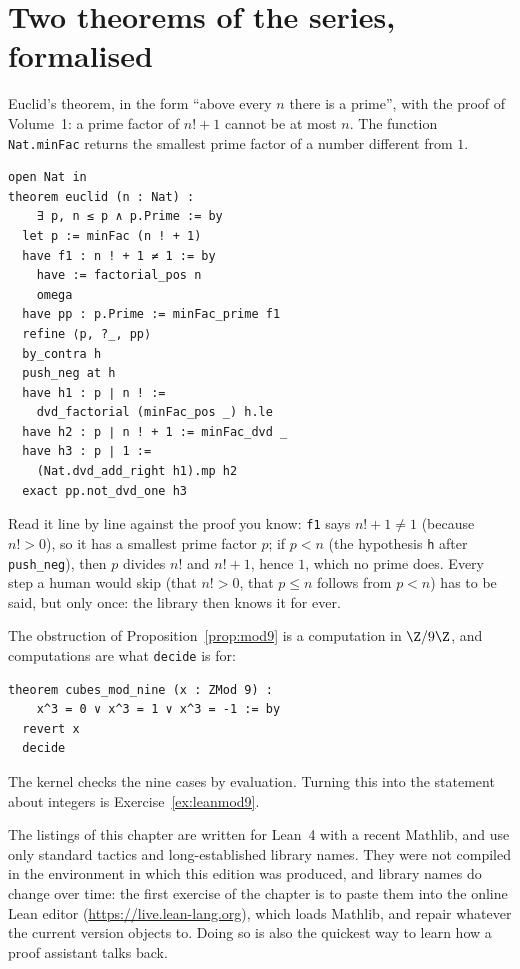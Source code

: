 \section{Two theorems of the series, formalised}

Euclid's theorem, in the form ``above every $n$ there is a prime'', with the proof of Volume~1: a prime factor of $n!+1$ cannot be at most $n$. The function \texttt{Nat.minFac} returns the
smallest prime factor of a number different from $1$.
\begin{verbatim}
open Nat in
theorem euclid (n : Nat) :
    ∃ p, n ≤ p ∧ p.Prime := by
  let p := minFac (n ! + 1)
  have f1 : n ! + 1 ≠ 1 := by
    have := factorial_pos n
    omega
  have pp : p.Prime := minFac_prime f1
  refine ⟨p, ?_, pp⟩
  by_contra h
  push_neg at h
  have h1 : p ∣ n ! :=
    dvd_factorial (minFac_pos _) h.le
  have h2 : p ∣ n ! + 1 := minFac_dvd _
  have h3 : p ∣ 1 :=
    (Nat.dvd_add_right h1).mp h2
  exact pp.not_dvd_one h3
\end{verbatim}
Read it line by line against the proof you know: \texttt{f1} says $n!+1\ne1$ (because $n!>0$), so it has a smallest prime factor $p$; if $p<n$ (the hypothesis \texttt{h} after \texttt{push\_neg}),
then $p$ divides $n!$ and $n!+1$, hence $1$, which no prime does. Every step a human would skip (that $n!>0$, that $p\le n$ follows from $p<n$) has to be said, but only once:
the library then knows it for ever.

The obstruction of Proposition~\ref{prop:mod9} is a computation in $\Z/9\Z$, and computations are what \texttt{decide} is for:
\begin{verbatim}
theorem cubes_mod_nine (x : ZMod 9) :
    x^3 = 0 ∨ x^3 = 1 ∨ x^3 = -1 := by
  revert x
  decide
\end{verbatim}
The kernel checks the nine cases by evaluation. Turning this into the statement about integers is Exercise~\ref{ex:leanmod9}.

\begin{remark}\label{rem:leanlistings}
The listings of this chapter are written for Lean~4 with a recent Mathlib, and use only standard tactics and long-established library names. They were not compiled in the
environment in which this edition was produced, and library names do change over time: the first exercise of the chapter is to paste them into the online Lean editor
(\url{https://live.lean-lang.org}), which loads Mathlib, and repair whatever the current version objects to. Doing so is also the quickest way to learn how a proof assistant talks back.
\end{remark}

